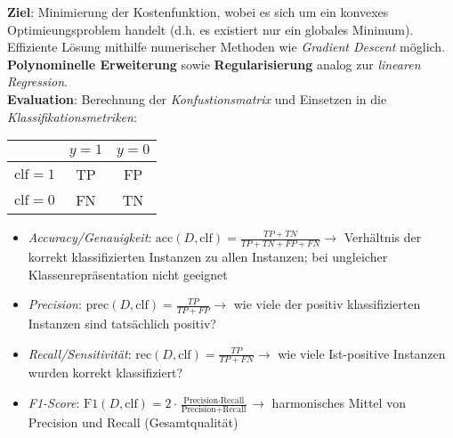 \textbf{Ziel}: Minimierung der Kostenfunktion, wobei es sich um ein konvexes Optimieungsproblem handelt (d.h. es existiert nur ein globales Minimum). Effiziente Lösung mithilfe numerischer Methoden wie \emph{Gradient Descent} möglich.\\

\textbf{Polynominelle Erweiterung} sowie \textbf{Regularisierung} analog zur \emph{linearen Regression}.\\

\textbf{Evaluation}: Berechnung der \emph{Konfustionsmatrix} und Einsetzen in die \emph{Klassifikationsmetriken}:

\begin{center}
    \begin{tabular}{|c|c|c|}
        \hline
        & $y=1$ & $y=0$\\
        \hline
        $\text{clf}=1$ & TP & FP\\
        $\text{clf}=0$ & FN & TN\\
        \hline
    \end{tabular}
\end{center}

\begin{itemize}
    \item \emph{Accuracy/Genauigkeit}: $\text{acc}(D, \text{clf})=\frac{TP+TN}{TP+TN+FP+FN}\rightarrow$ Verhältnis der korrekt klassifizierten Instanzen zu allen Instanzen; bei ungleicher Klassenrepräsentation nicht geeignet
    \item \emph{Precision}: $\text{prec}(D, \text{clf})=\frac{TP}{TP+FP}\rightarrow$ wie viele der positiv klassifizierten Instanzen sind tatsächlich positiv?
    \item \emph{Recall/Sensitivität}: $\text{rec}(D, \text{clf})=\frac{TP}{TP+FN}\rightarrow$ wie viele Ist-positive Instanzen wurden korrekt klassifiziert?
    \item \emph{F1-Score}: $\text{F1}(D, \text{clf})=2\cdot\frac{\text{Precision}\cdot\text{Recall}}{\text{Precision}+\text{Recall}}\rightarrow$ harmonisches Mittel von Precision und Recall (Gesamtqualität)
\end{itemize}

